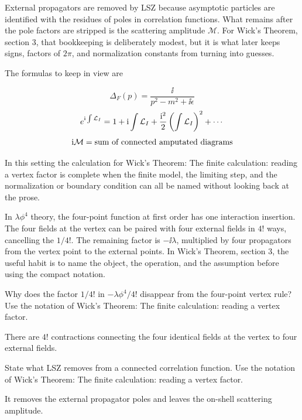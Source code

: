External propagators are removed by LSZ because asymptotic particles are identified with the residues of poles in correlation functions.  What remains after the pole factors are stripped is the scattering amplitude \(\mathcal M\).  For Wick's Theorem, section 3, that bookkeeping is deliberately modest, but it is what later keeps signs, factors of \(2\pi\), and normalization constants from turning into guesses.

The formulas to keep in view are

\[
  \Delta_F(p)=\frac{\ii}{p^2-m^2+\ii\epsilon}
\]
\[
  e^{\mathrm i\int\mathcal L_I}=1+\mathrm i\int\mathcal L_I+\frac{\mathrm i^2}{2}\left(\int\mathcal L_I\right)^2+\cdots
\]
\[
  \mathrm i\mathcal M=\hbox{sum of connected amputated diagrams}
\]

In this setting the calculation for Wick's Theorem: The finite calculation: reading a vertex factor is complete when the finite model, the limiting step, and the normalization or boundary condition can all be named without looking back at the prose.




\begin{example}
In \(\lambda\phi^4\) theory, the four-point function at first order has one interaction insertion.  The four fields at the vertex can be paired with four external fields in \(4!\) ways, cancelling the \(1/4!\).  The remaining factor is \(-\ii\lambda\), multiplied by four propagators from the vertex point to the external points.  In Wick's Theorem, section 3, the useful habit is to name the object, the operation, and the assumption before using the compact notation.
\end{example}



\begin{exercise}
Why does the factor \(1/4!\) in \(-\lambda\phi^4/4!\) disappear from the four-point vertex rule?  Use the notation of Wick's Theorem: The finite calculation: reading a vertex factor.
\begin{answer}
There are \(4!\) contractions connecting the four identical fields at the vertex to four external fields.
\end{answer}
\end{exercise}

\begin{exercise}
State what LSZ removes from a connected correlation function.  Use the notation of Wick's Theorem: The finite calculation: reading a vertex factor.
\begin{answer}
It removes the external propagator poles and leaves the on-shell scattering amplitude.
\end{answer}
\end{exercise}



